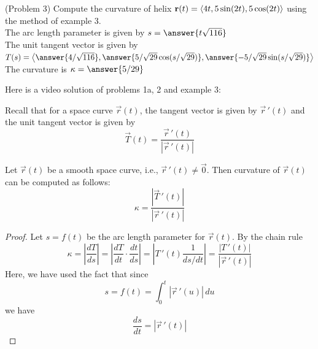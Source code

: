 \documentclass[handout]{ximera}
\begin{document}
\begin{problem}(Problem 3)
Compute the curvature of helix $\mathbf r(t) = \left\langle 4t, 5 \sin(2t),5\cos(2t)\right\rangle$ using the method of example 3.\\
The arc length parameter is given by $s = \answer{t\sqrt{116}}$\\
The unit tangent vector is given by $T(s) = \vector{\answer{4/\sqrt{116}}, \answer{5/\sqrt{29} \cos(s/\sqrt{29})}, \answer{-5/\sqrt{29} \sin(s/\sqrt{29})}}$\\
The curvature is $\kappa = \answer{5/29}$
\end{problem}
Here is a video solution of problems 1a, 2 and example 3:\\
\begin{foldable}
\end{foldable}

Recall that for a space curve $\vec r(t)$, the tangent vector is given by $\vec r\,'(t)$ and the unit tangent vector is given by
\[
\vec T(t) = \frac{\vec r\,'(t)}{|\vec r\,'(t)|}
\]



\begin{proposition}
Let $\vec r(t)$ be a smooth space curve, i.e., $\vec r\,'(t) \neq \vec 0$. Then curvature of $\vec r(t)$ can be computed as follows:
\[
\kappa = \frac{|\vec T\,'(t)|}{|\vec r\,'(t)|}
\]
\end{proposition}
\begin{proof}
Let $s = f(t)$ be the arc length parameter for $\vec r(t)$. By the chain rule
\[
\kappa = \left|\frac{dT}{ds}\right| = \left|\frac{dT}{dt} \cdot \frac{dt}{ds}\right| = \left|T\,'(t) \frac{1}{ds/dt}\right| = \frac{|T\,'(t)|}{|\vec r\,'(t)|}
\]
Here, we have used the fact that since
\[
s = f(t) = \int_0^t |\vec r\,'(u)| \, du
\]
we have
\[
\frac{ds}{dt} = |\vec r\,'(t)|
\]
\end{proof}
\end{document}
